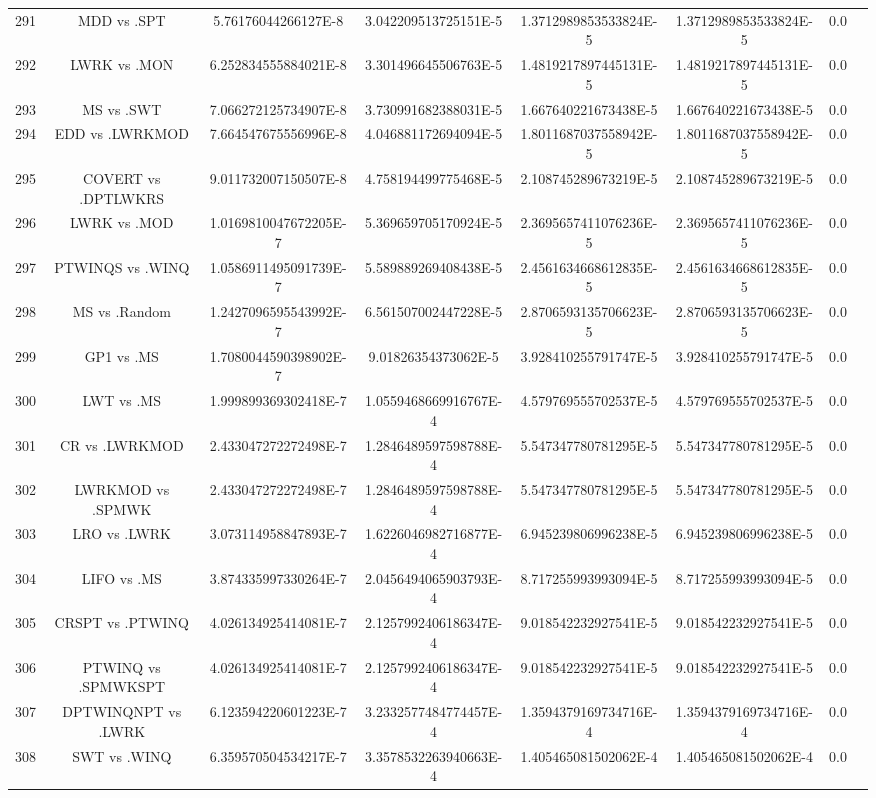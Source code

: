 \documentclass[a3paper,10pt]{article}
\begin{document}
\begin{table}[!htp]
\begin{tabular}{cccccccc}
291&MDD vs .SPT&5.76176044266127E-8&3.042209513725151E-5&1.3712989853533824E-5&1.3712989853533824E-5&0.0\\
292&LWRK vs .MON&6.252834555884021E-8&3.301496645506763E-5&1.4819217897445131E-5&1.4819217897445131E-5&0.0\\
293&MS vs .SWT&7.066272125734907E-8&3.730991682388031E-5&1.667640221673438E-5&1.667640221673438E-5&0.0\\
294&EDD vs .LWRKMOD&7.664547675556996E-8&4.046881172694094E-5&1.8011687037558942E-5&1.8011687037558942E-5&0.0\\
295&COVERT vs .DPTLWKRS&9.011732007150507E-8&4.758194499775468E-5&2.108745289673219E-5&2.108745289673219E-5&0.0\\
296&LWRK vs .MOD&1.0169810047672205E-7&5.369659705170924E-5&2.3695657411076236E-5&2.3695657411076236E-5&0.0\\
297&PTWINQS vs .WINQ&1.0586911495091739E-7&5.589889269408438E-5&2.4561634668612835E-5&2.4561634668612835E-5&0.0\\
298&MS vs .Random&1.2427096595543992E-7&6.561507002447228E-5&2.8706593135706623E-5&2.8706593135706623E-5&0.0\\
299&GP1 vs .MS&1.7080044590398902E-7&9.01826354373062E-5&3.928410255791747E-5&3.928410255791747E-5&0.0\\
300&LWT vs .MS&1.999899369302418E-7&1.0559468669916767E-4&4.579769555702537E-5&4.579769555702537E-5&0.0\\
301&CR vs .LWRKMOD&2.433047272272498E-7&1.2846489597598788E-4&5.547347780781295E-5&5.547347780781295E-5&0.0\\
302&LWRKMOD vs .SPMWK&2.433047272272498E-7&1.2846489597598788E-4&5.547347780781295E-5&5.547347780781295E-5&0.0\\
303&LRO vs .LWRK&3.073114958847893E-7&1.6226046982716877E-4&6.945239806996238E-5&6.945239806996238E-5&0.0\\
304&LIFO vs .MS&3.874335997330264E-7&2.0456494065903793E-4&8.717255993993094E-5&8.717255993993094E-5&0.0\\
305&CRSPT vs .PTWINQ&4.026134925414081E-7&2.1257992406186347E-4&9.018542232927541E-5&9.018542232927541E-5&0.0\\
306&PTWINQ vs .SPMWKSPT&4.026134925414081E-7&2.1257992406186347E-4&9.018542232927541E-5&9.018542232927541E-5&0.0\\
307&DPTWINQNPT vs .LWRK&6.123594220601223E-7&3.2332577484774457E-4&1.3594379169734716E-4&1.3594379169734716E-4&0.0\\
308&SWT vs .WINQ&6.359570504534217E-7&3.3578532263940663E-4&1.405465081502062E-4&1.405465081502062E-4&0.0\\

\end{tabular}
\end{table}
\end{document}
